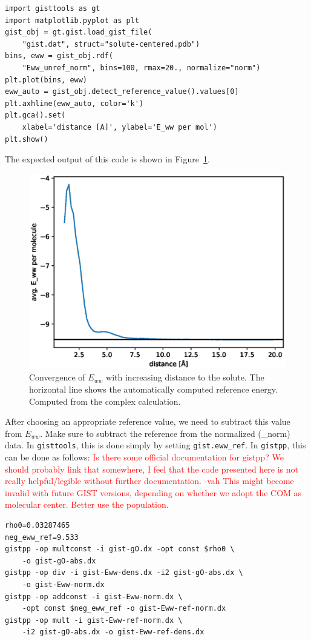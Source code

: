\documentclass[9pt,tutorial]{livecoms}
\newcommand{\software}{\texttt}
\newcommand{\todo}{\textcolor{red}}
\newcommand\inlinecode{\texttt}
\begin{document}
\begin{lstlisting}[style=python]
import gisttools as gt
import matplotlib.pyplot as plt
gist_obj = gt.gist.load_gist_file(
    "gist.dat", struct="solute-centered.pdb")
bins, eww = gist_obj.rdf(
    "Eww_unref_norm", bins=100, rmax=20., normalize="norm")
plt.plot(bins, eww)
eww_auto = gist_obj.detect_reference_value().values[0]
plt.axhline(eww_auto, color='k')
plt.gca().set(
    xlabel='distance [A]', ylabel='E_ww per mol')
plt.show()
\end{lstlisting}

The expected output of this code is shown in Figure~\ref{fig_ewwref}.

\begin{figure}
	\centering
	\includegraphics[width=0.8\linewidth]{figures/Eww_convergence.eps}
	\caption{Convergence of $E_{ww}$ with increasing distance to the solute. The horizontal line shows the automatically computed reference energy. Computed from the complex calculation.}\label{fig_ewwref}
\end{figure}

After choosing an appropriate reference value, we need to subtract this value from $E_{ww}$.
Make sure to subtract the reference from the normalized (\_norm) data.
In \software{gisttools}, this is done simply by setting \inlinecode{gist.eww\_ref}.
In \software{gistpp}, this can be done as follows: 
\todo{Is there some official documentation for gistpp? We should probably link that somewhere, I feel that the code presented here is not really helpful/legible without further documentation. -vah}
\todo{This might become invalid with future GIST versions, depending on whether we adopt the COM as molecular center.} 
\todo{Better use the population.}

\begin{lstlisting}[style=bash]
rho0=0.03287465
neg_eww_ref=9.533
gistpp -op multconst -i gist-gO.dx -opt const $rho0 \
    -o gist-gO-abs.dx 
gistpp -op div -i gist-Eww-dens.dx -i2 gist-gO-abs.dx \
    -o gist-Eww-norm.dx
gistpp -op addconst -i gist-Eww-norm.dx \
    -opt const $neg_eww_ref -o gist-Eww-ref-norm.dx
gistpp -op mult -i gist-Eww-ref-norm.dx \
    -i2 gist-gO-abs.dx -o gist-Eww-ref-dens.dx
\end{lstlisting}
\end{document}
